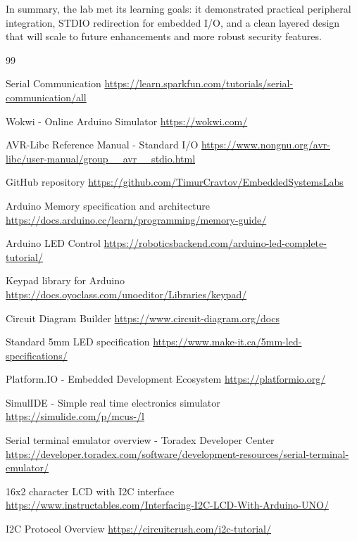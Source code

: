 In summary, the lab met its learning goals: it demonstrated practical peripheral integration, STDIO redirection for embedded I/O, and a clean layered design that will scale to future enhancements and more robust security features.

\begin{thebibliography}{99}

 Serial Communication \url{https://learn.sparkfun.com/tutorials/serial-communication/all}

 Wokwi - Online Arduino Simulator \url{https://wokwi.com/}

 AVR-Libc Reference Manual - Standard I/O \url{https://www.nongnu.org/avr-libc/user-manual/group__avr__stdio.html}

 GitHub repository \url{https://github.com/TimurCravtov/EmbeddedSystemsLabs}

 Arduino Memory specification and architecture \url{https://docs.arduino.cc/learn/programming/memory-guide/}

 Arduino LED Control \url{https://roboticsbackend.com/arduino-led-complete-tutorial/}

 Keypad library for Arduino \url{https://docs.oyoclass.com/unoeditor/Libraries/keypad/}

 Circuit Diagram Builder \url{https://www.circuit-diagram.org/docs}

 Standard 5mm LED specification \url{https://www.make-it.ca/5mm-led-specifications/}

 Platform.IO - Embedded Development Ecosystem \url{https://platformio.org/}

 SimulIDE - Simple real time electronics simulator \url{https://simulide.com/p/mcus-/l}

 Serial terminal emulator overview - Toradex Developer Center \url{https://developer.toradex.com/software/development-resources/serial-terminal-emulator/}

 16x2 character LCD with I2C interface \url{https://www.instructables.com/Interfacing-I2C-LCD-With-Arduino-UNO/}

 I2C Protocol Overview \url{https://circuitcrush.com/i2c-tutorial/}

\end{thebibliography}

